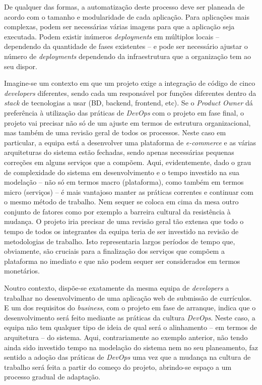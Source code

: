 \hspace{1cm}De qualquer das formas, a automatização deste processo deve ser planeada de acordo com o tamanho e modularidade de cada aplicação. Para aplicações mais complexas, podem ser necessárias várias imagens para que a aplicação seja executada. Podem existir inúmeros \textit{deployments} em múltiplos locais -- dependendo da quantidade de fases existentes -- e pode ser necessário ajustar o número de \textit{deployments} dependendo da infraestrutura que a organização tem ao seu dispor.

\hspace{1cm}Imagine-se um contexto em que um projeto exige a integração de código de cinco \textit{developers} diferentes, sendo cada um responsável por funções diferentes dentro da \textit{stack} de tecnologias a usar (BD, backend, frontend, etc). Se o \textit{Product Owner} dá preferência à utilização das práticas de \textit{DevOps} com o projeto em fase final, o projeto vai precisar não só de um ajuste em termos de estrutura organizacional, mas também de uma revisão geral de todos os processos. Neste caso em particular, a equipa está a desenvolver uma plataforma de \textit{e-commerce} e as várias arquiteturas do sistema estão fechadas, sendo apenas necessárias pequenas correções em alguns serviços que a compõem. Aqui, evidentemente, dado o grau de complexidade do sistema em desenvolvimento e o tempo investido na sua modelação -- não só em termos macro (plataforma), como também em termos micro (serviços) -- é mais vantajoso manter as práticas correntes e continuar com o mesmo método de trabalho. Nem sequer se coloca em cima da mesa outro conjunto de fatores como por exemplo a barreira cultural da resistência à mudança. O projeto iria precisar de uma revisão geral tão extensa que todo o tempo de todos os integrantes da equipa teria de ser investido na revisão de metodologias de trabalho. Isto representaria largos períodos de tempo que, obviamente, são cruciais para a finalização dos serviços que compõem a plataforma no imediato e que não podem sequer ser considerados em termos monetários.

\hspace{1cm}Noutro contexto, dispõe-se exatamente da mesma equipa de \textit{developers} a trabalhar no desenvolvimento de uma aplicação web de submissão de currículos. E um dos requisitos do \textit{business}, com o projeto em fase de arranque, indica que o desenvolvimento será feito mediante as práticas da cultura \textit{DevOps}. Neste caso, a equipa não tem qualquer tipo de ideia de qual será o alinhamento -- em termos de arquitetura -- do sistema. Aqui, contrariamente ao exemplo anterior, não tendo ainda sido investido tempo na modelação do sistema nem no seu planeamento, faz sentido a adoção das práticas de \textit{DevOps} uma vez que a mudança na cultura de trabalho será feita a partir do começo do projeto, abrindo-se espaço a um processo gradual de adaptação.

